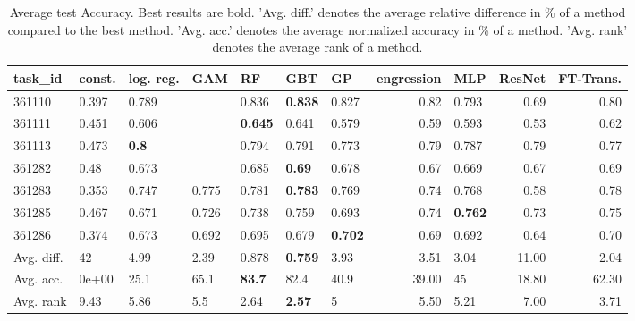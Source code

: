 \begin{table}[ht!]
\centering
\begingroup\footnotesize
\begin{tabular}{lllllllrlrr}
  \hline
\hline
task\_id & const. & log. reg. & GAM & RF & GBT & GP & engression & MLP & ResNet & FT-Trans. \\ 
  \hline
361110 & 0.397 & 0.789 &  & 0.836 & \textbf{0.838} & 0.827 & 0.82 & 0.793 & 0.69 & 0.80 \\ 
  361111 & 0.451 & 0.606 &  & \textbf{0.645} & 0.641 & 0.579 & 0.59 & 0.593 & 0.53 & 0.62 \\ 
  361113 & 0.473 & \textbf{0.8} &  & 0.794 & 0.791 & 0.773 & 0.79 & 0.787 & 0.79 & 0.77 \\ 
  361282 & 0.48 & 0.673 &  & 0.685 & \textbf{0.69} & 0.678 & 0.67 & 0.669 & 0.67 & 0.69 \\ 
  361283 & 0.353 & 0.747 & 0.775 & 0.781 & \textbf{0.783} & 0.769 & 0.74 & 0.768 & 0.58 & 0.78 \\ 
  361285 & 0.467 & 0.671 & 0.726 & 0.738 & 0.759 & 0.693 & 0.74 & \textbf{0.762} & 0.73 & 0.75 \\ 
  361286 & 0.374 & 0.673 & 0.692 & 0.695 & 0.679 & \textbf{0.702} & 0.69 & 0.692 & 0.64 & 0.70 \\ 
   \hline
Avg. diff. & 42 & 4.99 & 2.39 & 0.878 & \textbf{0.759} & 3.93 & 3.51 & 3.04 & 11.00 & 2.04 \\ 
  Avg. acc. & 0e+00 & 25.1 & 65.1 & \textbf{83.7} & 82.4 & 40.9 & 39.00 & 45 & 18.80 & 62.30 \\ 
  Avg. rank & 9.43 & 5.86 & 5.5 & 2.64 & \textbf{2.57} & 5 & 5.50 & 5.21 & 7.00 & 3.71 \\ 
   \hline
\hline
\end{tabular}
\endgroup
\caption{Average test Accuracy. 
                  Best results are bold. 
                  'Avg. diff.' denotes the average relative difference in \% of a method compared to the best method.
                  'Avg. acc.' denotes the average normalized accuracy in \% of a method.
                  'Avg. rank' denotes the average rank of a method.} 
\label{TABLES/table_results_Accuracy_gower_num_and_cat_features}
\end{table}
